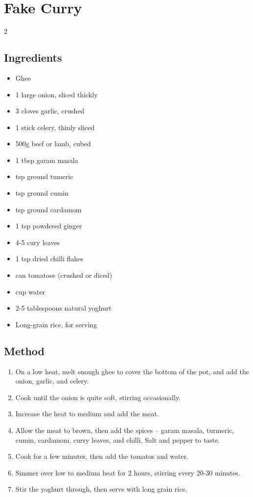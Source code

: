 \clearpage
\section{Fake Curry}


  \begin{multicols}{2}
    \subsection{Ingredients}
      \begin{itemize}
        \item Ghee
        \item 1 large onion, sliced thickly
        \item 3 cloves garlic, crushed
        \item 1 stick celery, thinly sliced
        \item 500g beef or lamb, cubed
        \item 1 tbsp garam masala
        \item {} tsp ground tumeric
        \item {} tsp ground cumin
        \item {} tsp ground cardamom
        \item 1 tsp powdered ginger
        \item 4-5 cury leaves
        \item 1 tsp dried chilli flakes
        \item {} can tomatoes (crushed or diced)
        \item {} cup water
        \item 2-5 tablespoons natural yoghurt
        \item Long-grain rice, for serving
      \end{itemize}
  \vfill\null
  \columnbreak
  \subsection{Method}
    \begin{enumerate}
      \item On a low heat, melt enough ghee to cover the bottom of the pot, and add the onion, garlic, and celery.
      \item Cook until the onion is quite soft, stirring occasionally.
      \item Increase the heat to medium and add the meat.
      \item Allow the meat to brown, then add the spices -- garam masala, turmeric, cumin, cardamom, curry leaves, and chilli. Salt and pepper to taste.
      \item Cook for a few minutes, then add the tomatos and water.
      \item Simmer over low to medium heat for 2 hours, stirring every 20-30 minutes.
      \item Stir the yoghurt through, then serve with long grain rice.
    \end{enumerate}
  \end{multicols}
